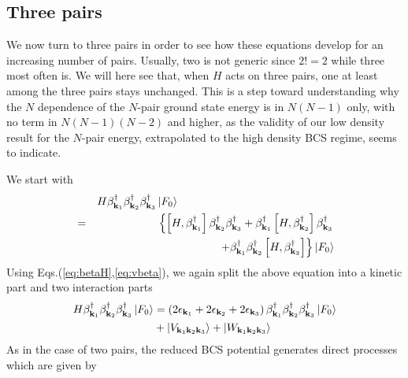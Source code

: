 \documentclass[epj]{svjour}
\begin{document}
\subsection{Three pairs}

We now turn to three pairs in order to see how these equations develop for an
increasing number of pairs. Usually, two is not generic since $2!=2$ while three most often is.  We will here see that, when $H$ acts on three pairs, one at least among the three pairs stays unchanged.   This is a step toward understanding why the $N$ dependence of the $N$-pair ground state energy is in $N(N-1)$ only, with no term in $N(N-1)(N-2)$ and higher, as the validity of our low density result for the $N$-pair energy, extrapolated to the high density BCS regime, seems to indicate.  


We start with 
\begin{eqnarray}  \label{eq:SchThree}
&&H\beta^{\dagger}_{\mathbf{k} _1}\beta^{\dagger}_{\mathbf{k}
_2}\beta^{\dagger}_{\mathbf{k} _3}\left|F_0\right>  \hspace{5cm}
\nonumber\\
&=&\left\{\left[H,\beta^{\dagger}_{\mathbf{k} _1}\right]  \beta^{\dagger}_{%
\mathbf{k} _2}\beta^{\dagger}_{\mathbf{k} _3}+\beta^{\dagger}_{\mathbf{k} _1}%
\left[H,\beta^{\dagger}_{\mathbf{k} _2}\right]  \beta^{\dagger}_{\mathbf{k}
_3}\right.
\nonumber\\ &&\left.
+\beta^{\dagger}_{\mathbf{k} _1}\beta^{\dagger}_{\mathbf{k} _2}\left[%
H,\beta^{\dagger}_{\mathbf{k} _3}\right]  \right\}
\left|F_0\right> 
\end{eqnarray}%
 Using Eqs.(\ref{eq:betaH},\ref{eq:vbeta}), we again  split the above equation into a kinetic part and two interaction parts
\begin{equation}  \label{eq:SchThree2}
\begin{split}
H\beta^{\dagger}_{\mathbf{k} _1}\beta^{\dagger}_{\mathbf{k}
_2}\beta^{\dagger}_{\mathbf{k} _3}\left|F_0\right>   &=\left(2\epsilon_{%
\mathbf{k} _1}+2\epsilon_{\mathbf{k} _2}+2\epsilon_{\mathbf{k} _3}\right)
\beta^{\dagger}_{\mathbf{k} _1}\beta^{\dagger}_{\mathbf{k}
_2}\beta^{\dagger}_{\mathbf{k} _3}\left|F_0\right>   \\
&+\left|{V}_{\mathbf{k} _1\mathbf{k} _2\mathbf{k} _3}\right> +\left|{W}_{\mathbf{k} _1\mathbf{k} _2\mathbf{k} _3}\right> 
\end{split}%
\end{equation}
As in the case of two pairs, the reduced BCS potential generates direct processes which are given by 
\end{document}
